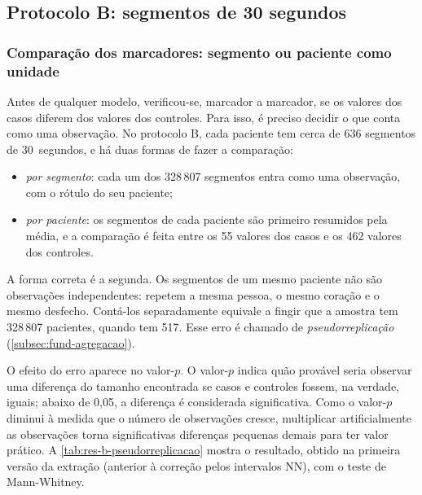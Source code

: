 \subsection{Protocolo B: segmentos de 30 segundos}
\label{subsec:res-protocolo-b}

\subsubsection{Comparação dos marcadores: segmento ou paciente como unidade}
\label{subsubsec:res-b-unidade}

Antes de qualquer modelo, verificou-se, marcador a marcador, se os valores
dos casos diferem dos valores dos controles. Para isso, é preciso decidir o
que conta como uma observação. No protocolo B, cada paciente tem cerca de
636 segmentos de 30~segundos, e há duas formas de fazer a comparação:

\begin{itemize}
	\item \textit{por segmento}: cada um dos 328\,807 segmentos entra como
	uma observação, com o rótulo do seu paciente;
	\item \textit{por paciente}: os segmentos de cada paciente são primeiro
	resumidos pela média, e a comparação é feita entre os 55 valores dos
	casos e os 462 valores dos controles.
\end{itemize}

\noindent
A forma correta é a segunda. Os segmentos de um mesmo paciente não são
observações independentes: repetem a mesma pessoa, o mesmo coração e o
mesmo desfecho. Contá-los separadamente equivale a fingir que a amostra tem
328\,807 pacientes, quando tem 517. Esse erro é chamado de
\textit{pseudorreplicação} (\autoref{subsec:fund-agregacao}).

O efeito do erro aparece no valor-$p$. O valor-$p$ indica quão provável
seria observar uma diferença do tamanho encontrada se casos e controles
fossem, na verdade, iguais; abaixo de 0,05, a diferença é considerada
significativa. Como o valor-$p$ diminui à medida que o número de observações
cresce, multiplicar artificialmente as observações torna significativas
diferenças pequenas demais para ter valor prático. A
\autoref{tab:res-b-pseudorreplicacao} mostra o resultado, obtido na primeira
versão da extração (anterior à correção pelos intervalos NN), com o teste de
Mann-Whitney.

